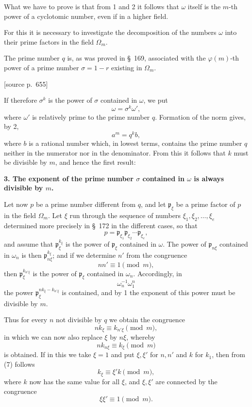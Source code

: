 \documentclass[11pt]{article}
\newcommand{\pp}{\mathfrak p}
\newcommand{\srcpage}[1]{\par\medskip\noindent\textsf{[source p.~#1]}\par\smallskip}
\begin{document}
What we have to prove is that from 1 and 2 it follows that $\omega$ itself is the $m$-th power of a cyclotomic number, even if in a higher field.

For this it is necessary to investigate the decomposition of the numbers $\omega$ into their prime factors in the field $\Omega_m$.

The prime number $q$ is, as was proved in \S~169, associated with the $\varphi(m)$-th power of a prime number $\sigma=1-r$ existing in $\Omega_m$.

\srcpage{655}
If therefore $\sigma^k$ is the power of $\sigma$ contained in $\omega$, we put
\[
  \omega=\sigma^k\omega',
\]
where $\omega'$ is relatively prime to the prime number $q$. Formation of the norm gives, by 2,
\[
  a^m=q^k b,
\]
where $b$ is a rational number which, in lowest terms, contains the prime number $q$ neither in the numerator nor in the denominator. From this it follows that $k$ must be divisible by $m$, and hence the first result:

\textbf{3. The exponent of the prime number $\sigma$ contained in $\omega$ is always divisible by $m$.}

Let now $p$ be a prime number different from $q$, and let $\pp_\xi$ be a prime factor of $p$ in the field $\Omega_m$. Let $\xi$ run through the sequence of numbers $\xi_1,\xi_2,\ldots,\xi_e$ determined more precisely in \S~172 in the different cases, so that
\begin{equation}
  p=\pp_{\xi_1}\pp_{\xi_2}\cdots\pp_{\xi_e},
\tag{3}
\end{equation}
and assume that $\pp_\xi^{k_\xi}$ is the power of $\pp_\xi$ contained in $\omega$. The power of $\pp_{n\xi}$ contained in $\omega_n$ is then $\pp_{n\xi}^{k_\xi}$; and if we determine $n'$ from the congruence
\begin{equation}
  nn'\equiv 1\pmod m,
\tag{4}
\end{equation}
then $\pp_\xi^{k_{n'\xi}}$ is the power of $\pp_\xi$ contained in $\omega_n$. Accordingly, in
\begin{equation}
  \omega_n^{-1}\omega_1^n
\tag{5}
\end{equation}
the power $\pp_\xi^{n k_\xi-k_{n'\xi}}$ is contained, and by 1 the exponent of this power must be divisible by $m$.

Thus for every $n$ not divisible by $q$ we obtain the congruence
\begin{equation}
  n k_\xi\equiv k_{n'\xi}\pmod m,
\tag{6}
\end{equation}
in which we can now also replace $\xi$ by $n\xi$, whereby
\begin{equation}
  n k_{n\xi}\equiv k_\xi\pmod m
\tag{7}
\end{equation}
is obtained. If in this we take $\xi=1$ and put $\xi,\xi'$ for $n,n'$ and $k$ for $k_1$, then from (7) follows
\begin{equation}
  k_\xi\equiv \xi' k\pmod m,
\tag{8}
\end{equation}
where $k$ now has the same value for all $\xi$, and $\xi,\xi'$ are connected by the congruence
\[
  \xi\xi'\equiv1\pmod m.
\]
\end{document}
